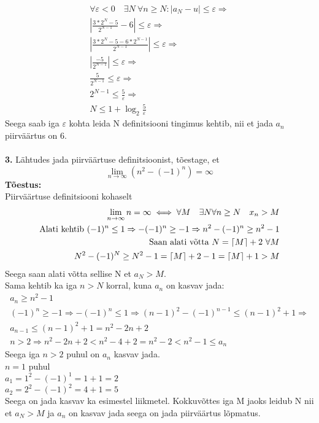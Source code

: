 \documentclass{article}
\DeclarePairedDelimiter\ceil{\lceil}{\rceil}
\begin{document}
\begin{equation*}
\begin{aligned}
\forall\varepsilon<0\quad \exists N\ \forall n\geq N: |a_N-u|\leq \varepsilon\Rightarrow\\
|\frac{3*2^{N}-5}{2^{N-1}}-6|\leq\varepsilon\Rightarrow\\
|\frac{3*2^{N}-5-6*2^{N-1}}{2^{N-1}}|\leq\varepsilon\Rightarrow\\
|\frac{-5}{2^{N-1}}|\leq\varepsilon\Rightarrow\\
\frac{5}{2^{N-1}}\leq\varepsilon\Rightarrow\\
2^{N-1}\leq\frac{5}{\varepsilon}\Rightarrow\\
N\leq1+\log_{2}\frac{5}{\varepsilon}
\end{aligned}
\end{equation*}
Seega saab iga $\varepsilon$ kohta leida N definitsiooni tingimus kehtib, nii et jada $a_n$ piirv\"a\"artus on 6.\\
\pagebreak\\
\textbf{3.} L\"ahtudes jada piirv\"a\"artuse definitsioonist, t\~oestage, et\\
\begin{equation*}
\lim_{n\to\infty}(n^2-(-1)^n)=\infty
\end{equation*}
\textbf{T\~oestus:}\\
Piirv\"a\"artuse definitsiooni kohaselt\\
\begin{equation*}
\begin{aligned}
\lim_{n\to\infty}n=\infty\iff\forall M\quad\exists N\forall n\geq N\quad x_n>M\\
\textup{Alati kehtib }(-1)^n \leq 1\Rightarrow-(-1)^n\geq-1 \Rightarrow n^2-(-1)^n\geq n^2-1\\
\textup{Saan alati v\~otta }N=\ceil{M}+2\ \forall M\\
N^2-(-1)^N\geq N^2-1 = \ceil M +2-1 = \ceil M +1 > M\\
\end{aligned}
\end{equation*}
Seega saan alati v\~otta sellise N et $a_N>M$.\\
Sama kehtib ka iga $n>N$ korral, kuna $a_n$ on kasvav jada:\\
\begin{equation*}
\begin{aligned}
a_n \geq n^2-1\\
(-1)^n \geq -1 \Rightarrow -(-1)^n\leq1\Rightarrow (n-1)^2-(-1)^{n-1}\leq (n-1)^2+1 \Rightarrow\\
a_{n-1} \leq (n-1)^2+1 = n^2-2n+2\\
n>2\Rightarrow n^2-2n+2<n^2-4+2=n^2-2<n^2-1\leq a_n
\end{aligned}
\end{equation*}
Seega iga $n>2$ puhul on $a_n$ kasvav jada.\\
$n=1$ puhul\\
$a_1 = 1^2-(-1)^1=1+1=2$\\
$a_2 = 2^2-(-1)^2=4+1=5$\\
Seega on jada kasvav ka esimestel liikmetel.
Kokkuv\~ottes iga M jaoks leidub N nii et $a_N>M$ ja $a_n$ on kasvav jada seega on jada piirv\"a\"artus l\~opmatus.
\end{document}
